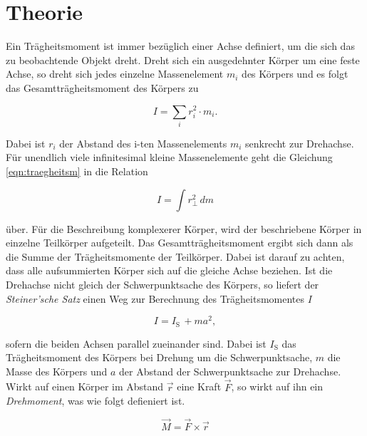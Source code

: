 \section{Theorie}
\label{sec:Theorie}

Ein Trägheitsmoment ist immer bezüglich einer Achse definiert, um die sich das zu beobachtende Objekt dreht.
Dreht sich ein ausgedehnter Körper um eine feste Achse, so dreht sich jedes einzelne Massenelement $m_i$ des Körpers
und es folgt das Gesamtträgheitsmoment des Körpers zu

\begin{equation*}
    \label{eqn:traegheitsm}
    I = \sum_i r_i^2 \cdot m_i.
\end{equation*}

\noindent
Dabei ist $r_i$ der Abstand des i-ten Massenelements $m_i$ senkrecht zur Drehachse.
Für unendlich viele infinitesimal kleine Massenelemente geht die Gleichung \autoref{eqn:traegheitsm} in die Relation 

\begin{equation*}
    \label{eqn:traegheitsmoment}
    I = \int r_{\perp}^2 \, dm
\end{equation*}

\noindent
über.
Für die Beschreibung komplexerer Körper, wird der beschriebene Körper in einzelne Teilkörper aufgeteilt. Das Gesamtträgheitsmoment ergibt
sich dann als die Summe der Trägheitsmomente der Teilkörper. Dabei ist darauf zu achten, dass alle aufsummierten Körper sich auf die 
gleiche Achse beziehen.
Ist die Drehachse nicht gleich der Schwerpunktsache des Körpers, so liefert der \textit{Steiner'sche Satz} einen Weg zur Berechnung des
Trägheitsmomentes $I$

\begin{equation}
    \label{eqn:steiner}
    I = I_{\text{S}} \, + m a^2,
\end{equation}

\noindent
sofern die beiden Achsen parallel zueinander sind.
Dabei ist $I_{\text{S}}$ das Trägheitsmoment des Körpers bei Drehung um die Schwerpunktsache, $m$ die Masse des Körpers und $a$ der 
Abstand der Schwerpunktsache zur Drehachse. 
\noindent
Wirkt auf einen Körper im Abstand $\vec r$ eine Kraft $\vec F$, so wirkt auf ihn ein \textit{Drehmoment}, was wie folgt defieniert ist.

\begin{equation*}
    \label{eqn:drehmoment}
    \vec M = \vec F\times\vec r
\end{equation*}


